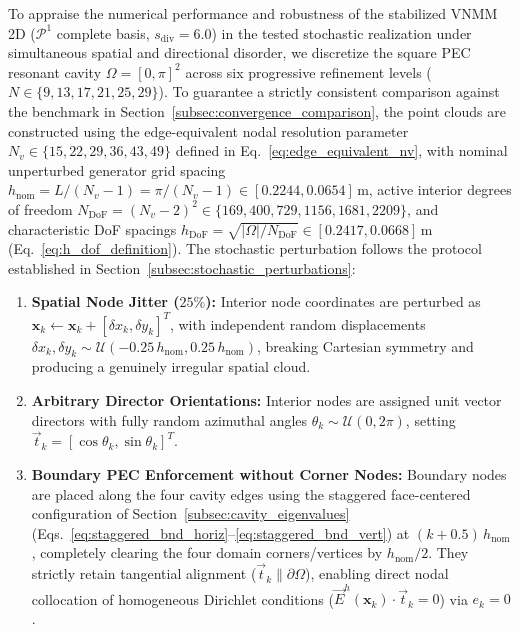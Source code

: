 \documentclass[preprint,12pt]{elsarticle}
\begin{document}
To appraise the numerical performance and robustness of the stabilized VNMM 2D ($\mathcal{P}^1$ complete basis, $s_{\mathrm{div}} = 6.0$) in the tested stochastic realization under simultaneous spatial and directional disorder, we discretize the square PEC resonant cavity $\Omega = [0, \pi]^2$ across six progressive refinement levels ($N \in \{9, 13, 17, 21, 25, 29\}$). To guarantee a strictly consistent comparison against the benchmark in Section~\ref{subsec:convergence_comparison}, the point clouds are constructed using the edge-equivalent nodal resolution parameter $N_v \in \{15, 22, 29, 36, 43, 49\}$ defined in Eq.~\eqref{eq:edge_equivalent_nv}, with nominal unperturbed generator grid spacing $h_{\mathrm{nom}} = L / (N_v - 1) = \pi / (N_v - 1) \in [0.2244, 0.0654]$\,m, active interior degrees of freedom $N_{\mathrm{DoF}} = (N_v - 2)^2 \in \{169, 400, 729, 1156, 1681, 2209\}$, and characteristic DoF spacings $h_{\mathrm{DoF}} = \sqrt{|\Omega|/N_{\mathrm{DoF}}} \in [0.2417, 0.0668]$\,m (Eq.~\eqref{eq:h_dof_definition}). The stochastic perturbation follows the protocol established in Section~\ref{subsec:stochastic_perturbations}:
\begin{enumerate}
    \item \textbf{Spatial Node Jitter ($25\%$):} Interior node coordinates are perturbed as $\mathbf{x}_k \leftarrow \mathbf{x}_k + [\delta x_k, \delta y_k]^T$, with independent random displacements $\delta x_k, \delta y_k \sim \mathcal{U}(-0.25\,h_{\mathrm{nom}}, 0.25\,h_{\mathrm{nom}})$, breaking Cartesian symmetry and producing a genuinely irregular spatial cloud.
    \item \textbf{Arbitrary Director Orientations:} Interior nodes are assigned unit vector directors with fully random azimuthal angles $\theta_k \sim \mathcal{U}(0, 2\pi)$, setting $\vec{t}_k = [\cos\theta_k, \sin\theta_k]^T$.
    \item \textbf{Boundary PEC Enforcement without Corner Nodes:} Boundary nodes are placed along the four cavity edges using the staggered face-centered configuration of Section~\ref{subsec:cavity_eigenvalues} (Eqs.~\eqref{eq:staggered_bnd_horiz}--\eqref{eq:staggered_bnd_vert}) at $(k + 0.5)\,h_{\mathrm{nom}}$, completely clearing the four domain corners/vertices by $h_{\mathrm{nom}}/2$. They strictly retain tangential alignment ($\vec{t}_k \parallel \partial\Omega$), enabling direct nodal collocation of homogeneous Dirichlet conditions ($\vec{E}^h(\mathbf{x}_k) \cdot \vec{t}_k = 0$) via $e_k = 0$.
\end{enumerate}
\end{document}
